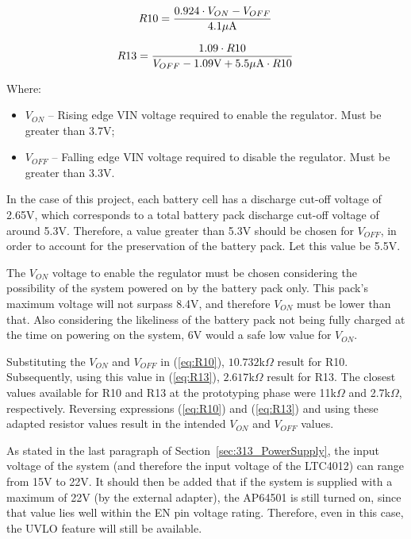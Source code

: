 \begin{equation}\label{eq:R10}
	R10 = \frac{0.924 \cdot V_{ON} - V_{OFF}}{4.1 \mu \textrm{A}}\,\medskip
\end{equation}

\begin{equation}\label{eq:R13}
	R13 = \frac{1.09 \cdot R10}{V_{OFF} - 1.09 \textrm{V} + 5.5 \mu \textrm{A} \cdot R10}\,\medskip
\end{equation}

Where:
\begin{itemize}
	\item $V_{ON}$ -- Rising edge VIN voltage required to enable the regulator. Must be greater than 3.7V;
	\item $V_{OFF}$ -- Falling edge VIN voltage required to disable the regulator. Must be greater than 3.3V.
\end{itemize}

In the case of this project, each battery cell has a discharge cut-off voltage of 2.65V, which corresponds to a total battery pack discharge cut-off voltage of around 5.3V. Therefore, a value greater than 5.3V should be chosen for $V_{OFF}$, in order to account for the preservation of the battery pack. Let this value be 5.5V.

The $V_{ON}$ voltage to enable the regulator must be chosen considering the possibility of the system powered on by the battery pack only. This pack's maximum voltage will not surpass 8.4V, and therefore $V_{ON}$ must be lower than that. Also considering the likeliness of the battery pack not being fully charged at the time on powering on the system, 6V would a safe low value for $V_{ON}$.

Substituting the $V_{ON}$ and $V_{OFF}$ in (\ref{eq:R10}), $10.732$k$\Omega$ result for R10. Subsequently, using this value in (\ref{eq:R13}), $2.617$k$\Omega$ result for R13. The closest values available for R10 and R13 at the prototyping phase were 11k$\Omega$ and 2.7k$\Omega$, respectively. Reversing expressions (\ref{eq:R10}) and (\ref{eq:R13}) and using these adapted resistor values result in the intended $V_{ON}$ and $V_{OFF}$ values.

As stated in the last paragraph of Section~\ref{sec:313_PowerSupply}, the input voltage of the system (and therefore the input voltage of the LTC4012) can range from 15V to 22V. It should then be added that if the system is supplied with a maximum of 22V (by the external adapter), the AP64501 is still turned on, since that value lies well within the EN pin voltage rating. Therefore, even in this case, the UVLO feature will still be available.

